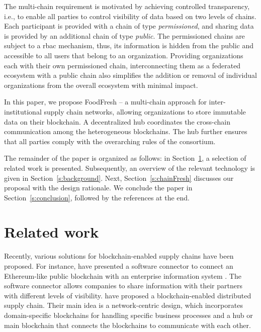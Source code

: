 \documentclass[conference,a4paper,flushend]{neutr}
\begin{document}
The multi-chain requirement is motivated by achieving controlled transparency, i.e., to enable all parties to control visibility of data based on two levels of chains. Each participant is provided with a chain of type \emph{permissioned}, and sharing data is provided by an additional chain of type \emph{public}. The permissioned chains are subject to a \ac{rbac} mechanism, thus, its information is hidden from the public and accessible to all users that belong to an organization. Providing organizations each with their own permissioned chain, interconnecting them as a federated ecosystem with a public chain also simplifies the addition or removal of individual organizations from the overall ecosystem with minimal impact.

In this paper, we propose FoodFresh -- a multi-chain approach for inter-institutional supply chain networks, allowing organizations to store immutable data on their blockchain. A decentralized hub coordinates the cross-chain communication among the heterogeneous blockchains.  The hub further ensures that all parties comply with the overarching rules of the consortium. 

The remainder of the paper is organized as follows: in Section~\ref{s:related_work}, a selection of related work is presented. Subsequently, an overview of the relevant technology is given in Section~\ref{s:background}. Next, Section~\ref{s:chainFresh} discusses our proposal with the design rationale. We conclude the paper in Section~\ref{s:conclusion}, followed by the references at the end. 

\section{Related work} \label{s:related_work}
Recently, various solutions for blockchain-enabled supply chains have been proposed. For instance, \citeauthor{longo2019blockchain} have presented a software connector to connect an Ethereum-like public blockchain with an enterprise information system \cite{longo2019blockchain}. The software connector allows companies to share information with their partners with different levels of visibility. \citeauthor{schulz2018multichain} \cite{schulz2018multichain} have proposed a blockchain-enabled distributed supply chain. Their main idea is a network-centric design, which incorporates domain-specific blockchains for handling specific business processes and a hub or main blockchain that connects the blockchains to communicate with each other. 
\end{document}
